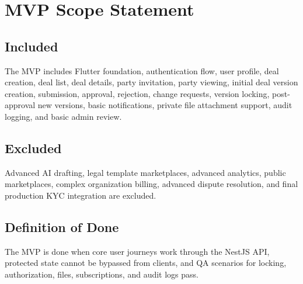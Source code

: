 \chapter{MVP Scope Statement}
\section{Included}
The MVP includes Flutter foundation, authentication flow, user profile, deal creation, deal list, deal details, party invitation, party viewing, initial deal version creation, submission, approval, rejection, change requests, version locking, post-approval new versions, basic notifications, private file attachment support, audit logging, and basic admin review.
\section{Excluded}
Advanced AI drafting, legal template marketplaces, advanced analytics, public marketplaces, complex organization billing, advanced dispute resolution, and final production KYC integration are excluded.
\section{Definition of Done}
The MVP is done when core user journeys work through the NestJS API, protected state cannot be bypassed from clients, and QA scenarios for locking, authorization, files, subscriptions, and audit logs pass.
